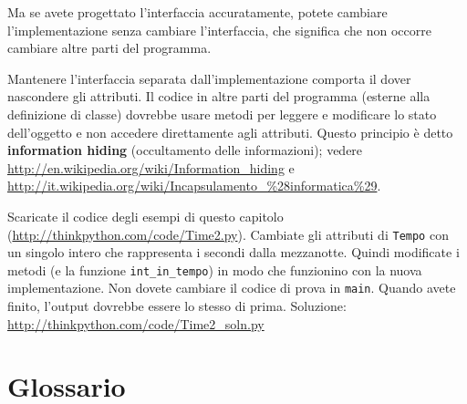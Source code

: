 \documentclass[10pt]{book}
\begin{document}
Ma se avete progettato l'interfaccia accuratamente, potete cambiare l'implementazione senza cambiare l'interfaccia, che significa che non occorre cambiare altre parti del programma.

Mantenere l'interfaccia separata dall'implementazione comporta il dover nascondere gli attributi. Il codice in altre parti del programma (esterne alla definizione di classe) dovrebbe usare metodi per leggere e modificare lo stato dell'oggetto e non accedere direttamente agli attributi.  Questo principio è detto {\bf information hiding} (occultamento delle informazioni);
vedere \url{http://en.wikipedia.org/wiki/Information_hiding} e \url{http://it.wikipedia.org/wiki/Incapsulamento_%28informatica%29}.

\vspace{0.2in}
\begin{exercise}

Scaricate il codice degli esempi di questo capitolo
(\url{http://thinkpython.com/code/Time2.py}).  Cambiate gli attributi di {\tt Tempo} con un singolo intero che rappresenta i secondi dalla mezzanotte. Quindi modificate i metodi (e la funzione \verb"int_in_tempo") in modo che funzionino con la nuova implementazione. Non dovete cambiare il codice di prova in {\tt main}.  Quando avete finito, l'output dovrebbe essere lo stesso di prima. Soluzione: \url{http://thinkpython.com/code/Time2_soln.py}

\end{exercise}


\section{Glossario}
\end{document}
